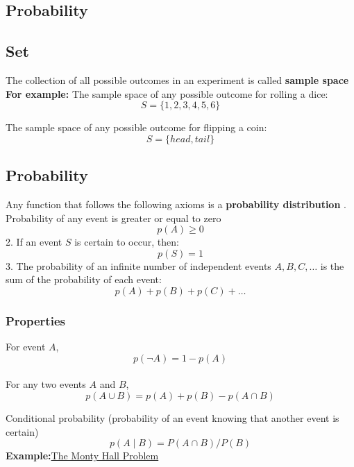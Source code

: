 \documentclass[11pt]{article}
\begin{document}
\begin{flushleft}
\section{Probability}
\subsection{Set}
The collection of all possible outcomes in an experiment is called \textbf{sample space} \newline
\quad \newline
\textbf{For example:} \newline
The sample space of any possible outcome for rolling a dice: \newline
$$
    S = \{1, 2, 3, 4, 5, 6\}
$$

The sample space of any possible outcome for flipping a coin: \newline
$$
    S = \{head, tail\}
$$
\subsection{Probability}
Any function that follows the following axioms is a \textbf{probability distribution} \newline
\quad {}. Probability of any event is greater or equal to zero \newline
\quad
$$p(A) \geq 0$$
2. If an event $S$ is certain to occur, then:   
$$p(S) = 1$$
3. The probability of an infinite number of independent events $A, B, C,\ldots$ is the sum of the probability of each event:  
$$p(A) + p(B) + p(C) + \ldots$$  
\subsubsection{Properties}
For event $A$,  \newline
\quad
$$p(\lnot{A}) = 1 - p(A)$$ \\ 
For any two events $A$ and $B$,  \newline
\quad 
$$p(A \cup B) = p(A) + p(B) - p(A \cap B)$$  

Conditional probability (probability of an event knowing that another event is certain)  \newline
\quad 
$$p(A \mid B) = P(A \cap B) / P(B)$$
\quad \newline
\textbf{Example:}\href{https://www.montyhallproblem.com/}{The Monty Hall Problem}


\end{flushleft}
\end{document}
